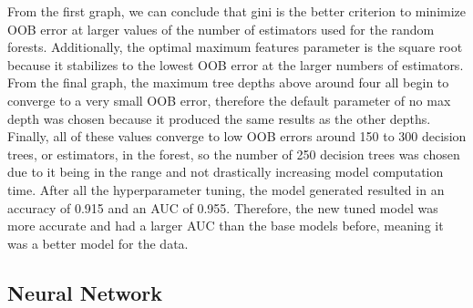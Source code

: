 \documentclass{article}
\begin{document}
\noindent From the first graph, we can conclude that gini is the better criterion to minimize OOB error at larger values of the number of estimators used for the random forests. Additionally, the optimal maximum features parameter is the square root because it stabilizes to the lowest OOB error at the larger numbers of estimators. From the final graph, the maximum tree depths above around four all begin to converge to a very small OOB error, therefore the default parameter of no max depth was chosen because it produced the same results as the other depths. Finally, all of these values converge to low OOB errors around 150 to 300 decision trees, or estimators, in the forest, so the number of 250 decision trees was chosen due to it being in the range and not drastically increasing model computation time. After all the hyperparameter tuning, the model generated resulted in an accuracy of 0.915 and an AUC of 0.955. Therefore, the new tuned model was more accurate and had a larger AUC than the base models before, meaning it was a better model for the data.


\subsection{Neural Network}
\end{document}
